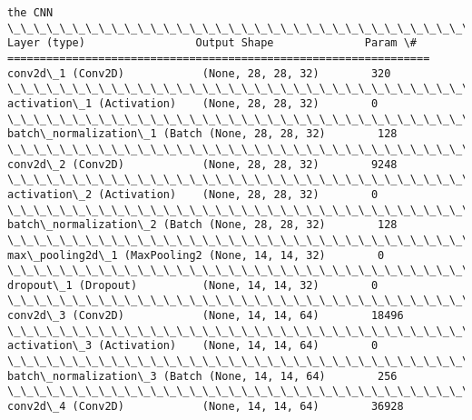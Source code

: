 \documentclass[11pt]{article}
\begin{document}
    \begin{Verbatim}[commandchars=\\\{\}]
the CNN
\_\_\_\_\_\_\_\_\_\_\_\_\_\_\_\_\_\_\_\_\_\_\_\_\_\_\_\_\_\_\_\_\_\_\_\_\_\_\_\_\_\_\_\_\_\_\_\_\_\_\_\_\_\_\_\_\_\_\_\_\_\_\_\_\_
Layer (type)                 Output Shape              Param \#   
=================================================================
conv2d\_1 (Conv2D)            (None, 28, 28, 32)        320       
\_\_\_\_\_\_\_\_\_\_\_\_\_\_\_\_\_\_\_\_\_\_\_\_\_\_\_\_\_\_\_\_\_\_\_\_\_\_\_\_\_\_\_\_\_\_\_\_\_\_\_\_\_\_\_\_\_\_\_\_\_\_\_\_\_
activation\_1 (Activation)    (None, 28, 28, 32)        0         
\_\_\_\_\_\_\_\_\_\_\_\_\_\_\_\_\_\_\_\_\_\_\_\_\_\_\_\_\_\_\_\_\_\_\_\_\_\_\_\_\_\_\_\_\_\_\_\_\_\_\_\_\_\_\_\_\_\_\_\_\_\_\_\_\_
batch\_normalization\_1 (Batch (None, 28, 28, 32)        128       
\_\_\_\_\_\_\_\_\_\_\_\_\_\_\_\_\_\_\_\_\_\_\_\_\_\_\_\_\_\_\_\_\_\_\_\_\_\_\_\_\_\_\_\_\_\_\_\_\_\_\_\_\_\_\_\_\_\_\_\_\_\_\_\_\_
conv2d\_2 (Conv2D)            (None, 28, 28, 32)        9248      
\_\_\_\_\_\_\_\_\_\_\_\_\_\_\_\_\_\_\_\_\_\_\_\_\_\_\_\_\_\_\_\_\_\_\_\_\_\_\_\_\_\_\_\_\_\_\_\_\_\_\_\_\_\_\_\_\_\_\_\_\_\_\_\_\_
activation\_2 (Activation)    (None, 28, 28, 32)        0         
\_\_\_\_\_\_\_\_\_\_\_\_\_\_\_\_\_\_\_\_\_\_\_\_\_\_\_\_\_\_\_\_\_\_\_\_\_\_\_\_\_\_\_\_\_\_\_\_\_\_\_\_\_\_\_\_\_\_\_\_\_\_\_\_\_
batch\_normalization\_2 (Batch (None, 28, 28, 32)        128       
\_\_\_\_\_\_\_\_\_\_\_\_\_\_\_\_\_\_\_\_\_\_\_\_\_\_\_\_\_\_\_\_\_\_\_\_\_\_\_\_\_\_\_\_\_\_\_\_\_\_\_\_\_\_\_\_\_\_\_\_\_\_\_\_\_
max\_pooling2d\_1 (MaxPooling2 (None, 14, 14, 32)        0         
\_\_\_\_\_\_\_\_\_\_\_\_\_\_\_\_\_\_\_\_\_\_\_\_\_\_\_\_\_\_\_\_\_\_\_\_\_\_\_\_\_\_\_\_\_\_\_\_\_\_\_\_\_\_\_\_\_\_\_\_\_\_\_\_\_
dropout\_1 (Dropout)          (None, 14, 14, 32)        0         
\_\_\_\_\_\_\_\_\_\_\_\_\_\_\_\_\_\_\_\_\_\_\_\_\_\_\_\_\_\_\_\_\_\_\_\_\_\_\_\_\_\_\_\_\_\_\_\_\_\_\_\_\_\_\_\_\_\_\_\_\_\_\_\_\_
conv2d\_3 (Conv2D)            (None, 14, 14, 64)        18496     
\_\_\_\_\_\_\_\_\_\_\_\_\_\_\_\_\_\_\_\_\_\_\_\_\_\_\_\_\_\_\_\_\_\_\_\_\_\_\_\_\_\_\_\_\_\_\_\_\_\_\_\_\_\_\_\_\_\_\_\_\_\_\_\_\_
activation\_3 (Activation)    (None, 14, 14, 64)        0         
\_\_\_\_\_\_\_\_\_\_\_\_\_\_\_\_\_\_\_\_\_\_\_\_\_\_\_\_\_\_\_\_\_\_\_\_\_\_\_\_\_\_\_\_\_\_\_\_\_\_\_\_\_\_\_\_\_\_\_\_\_\_\_\_\_
batch\_normalization\_3 (Batch (None, 14, 14, 64)        256       
\_\_\_\_\_\_\_\_\_\_\_\_\_\_\_\_\_\_\_\_\_\_\_\_\_\_\_\_\_\_\_\_\_\_\_\_\_\_\_\_\_\_\_\_\_\_\_\_\_\_\_\_\_\_\_\_\_\_\_\_\_\_\_\_\_
conv2d\_4 (Conv2D)            (None, 14, 14, 64)        36928     

\end{Verbatim}
\end{document}
